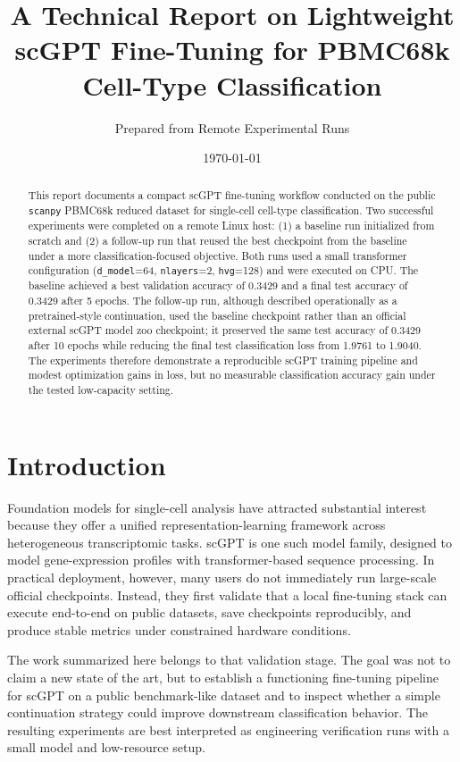 \documentclass[11pt]{article}
\title{A Technical Report on Lightweight scGPT Fine-Tuning for PBMC68k Cell-Type Classification}
\author{Prepared from Remote Experimental Runs}
\date{\today}
\begin{document}
\maketitle
\onehalfspacing

\begin{abstract}
This report documents a compact scGPT fine-tuning workflow conducted on the public \texttt{scanpy} PBMC68k reduced dataset for single-cell cell-type classification. Two successful experiments were completed on a remote Linux host: (1) a baseline run initialized from scratch and (2) a follow-up run that reused the best checkpoint from the baseline under a more classification-focused objective. Both runs used a small transformer configuration (\texttt{d\_model}=64, \texttt{nlayers}=2, \texttt{hvg}=128) and were executed on CPU. The baseline achieved a best validation accuracy of 0.3429 and a final test accuracy of 0.3429 after 5 epochs. The follow-up run, although described operationally as a pretrained-style continuation, used the baseline checkpoint rather than an official external scGPT model zoo checkpoint; it preserved the same test accuracy of 0.3429 after 10 epochs while reducing the final test classification loss from 1.9761 to 1.9040. The experiments therefore demonstrate a reproducible scGPT training pipeline and modest optimization gains in loss, but no measurable classification accuracy gain under the tested low-capacity setting.
\end{abstract}

\section{Introduction}
Foundation models for single-cell analysis have attracted substantial interest because they offer a unified representation-learning framework across heterogeneous transcriptomic tasks. scGPT is one such model family, designed to model gene-expression profiles with transformer-based sequence processing. In practical deployment, however, many users do not immediately run large-scale official checkpoints. Instead, they first validate that a local fine-tuning stack can execute end-to-end on public datasets, save checkpoints reproducibly, and produce stable metrics under constrained hardware conditions.

The work summarized here belongs to that validation stage. The goal was not to claim a new state of the art, but to establish a functioning fine-tuning pipeline for scGPT on a public benchmark-like dataset and to inspect whether a simple continuation strategy could improve downstream classification behavior. The resulting experiments are best interpreted as engineering verification runs with a small model and low-resource setup.
\end{document}
